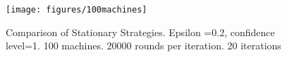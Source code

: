 \begin{figure}[h]
    \centering
    \texttt{[image: figures/100machines]}
    \caption[Comparison for 100 machines]{Comparison of Stationary Strategies. Epsilon =0.2, confidence level=1. 100 machines. 20000 rounds per iteration. 20 iterations}
    \label{fig: all4}
\end{figure}